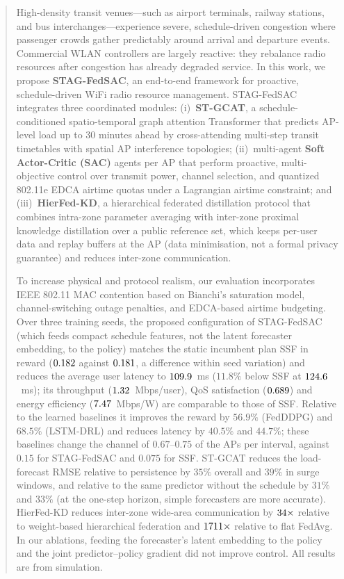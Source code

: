 \begin{abstract}
High-density transit venues---such as airport terminals, railway stations, and bus interchanges---experience severe, schedule-driven congestion where passenger crowds gather predictably around arrival and departure events. Commercial WLAN controllers are largely reactive: they rebalance radio resources after congestion has already degraded service. In this work, we propose \textbf{STAG-FedSAC}, an end-to-end framework for proactive, schedule-driven WiFi radio resource management. STAG-FedSAC integrates three coordinated modules: (i)~\textbf{ST-GCAT}, a schedule-conditioned spatio-temporal graph attention Transformer that predicts AP-level load up to 30 minutes ahead by cross-attending multi-step transit timetables with spatial AP interference topologies; (ii)~multi-agent \textbf{Soft Actor-Critic (SAC)} agents per AP that perform proactive, multi-objective control over transmit power, channel selection, and quantized 802.11e EDCA airtime quotas under a Lagrangian airtime constraint; and (iii)~\textbf{HierFed-KD}, a hierarchical federated distillation protocol that combines intra-zone parameter averaging with inter-zone proximal knowledge distillation over a public reference set, which keeps per-user data and replay buffers at the AP (data minimisation, not a formal privacy guarantee) and reduces inter-zone communication.

To increase physical and protocol realism, our evaluation incorporates IEEE 802.11 MAC contention based on Bianchi's saturation model, channel-switching outage penalties, and EDCA-based airtime budgeting. Over three training seeds, the proposed configuration of STAG-FedSAC (which feeds compact schedule features, not the latent forecaster embedding, to the policy) matches the static incumbent plan SSF in reward ($\mPropReward$ against $\mSSFReward$, a difference within seed variation) and reduces the average user latency to $\mPropLat$~ms ($11.8\%$ below SSF at $\mSSFLat$~ms); its throughput ($\mPropTput$~Mbps/user), QoS satisfaction ($\mPropQos$) and energy efficiency ($\mPropEeff$~Mbps/W) are comparable to those of SSF. Relative to the learned baselines it improves the reward by $56.9\%$ (FedDDPG) and $68.5\%$ (LSTM-DRL) and reduces latency by $40.5\%$ and $44.7\%$; these baselines change the channel of $0.67$--$0.75$ of the APs per interval, against $0.15$ for STAG-FedSAC and $0.075$ for SSF. ST-GCAT reduces the load-forecast RMSE relative to persistence by $35\%$ overall and $39\%$ in surge windows, and relative to the same predictor without the schedule by $31\%$ and $33\%$ (at the one-step horizon, simple forecasters are more accurate). HierFed-KD reduces inter-zone wide-area communication by $\commRatioAFive\times$ relative to weight-based hierarchical federation and $\commRatioFlat\times$ relative to flat FedAvg. In our ablations, feeding the forecaster's latent embedding to the policy and the joint predictor--policy gradient did not improve control. All results are from simulation.
\end{abstract}
